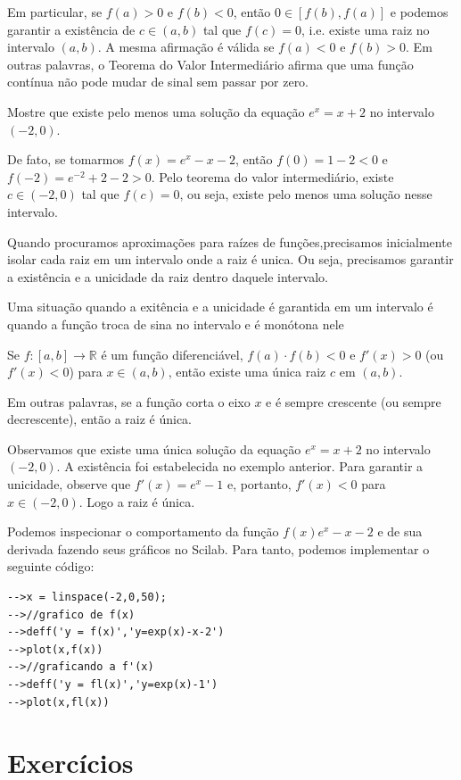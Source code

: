 Em particular, se $f(a)>0$ e $f(b)<0$, então $0\in [f(b),f(a)]$ e podemos garantir a existência de $c\in(a,b)$ tal que $f(c)=0$, i.e. existe uma raiz no intervalo $(a,b)$. A mesma afirmação é válida se $f(a)<0$ e $f(b)>0$. Em outras palavras, o Teorema do Valor Intermediário afirma que uma função contínua não pode mudar de sinal sem passar por zero.

\begin{ex}
Mostre que existe pelo menos uma solução da equação $e^x=x+2$ no intervalo $(-2,0)$.

De fato, se tomarmos $f(x)=e^x-x-2$, então $f(0)=1-2<0$ e $f(-2)=e^{-2}+2-2>0$. Pelo teorema do valor intermediário, existe $c\in(-2,0)$ tal que $f(c)=0$, ou seja, existe pelo menos uma solução nesse intervalo.
\end{ex}
Quando procuramos aproximações para raízes de funções,precisamos inicialmente isolar cada raiz em um intervalo onde a raiz é unica. Ou seja, precisamos garantir a existência e a unicidade da raiz dentro daquele intervalo.

Uma situação quando a exitência e a unicidade é garantida em um intervalo é quando a função troca de sina no intervalo e é monótona nele

\begin{teo}
Se $f:[a,b]\to\mathbb{R}$ é um função diferenciável, $f(a)\cdot f(b)<0$ e $f'(x)>0$ (ou $f'(x)<0$) para $x\in(a,b)$, então existe uma única raiz $c$ em $(a,b)$.
\end{teo}

Em outras palavras, se a função corta o eixo $x$ e é sempre crescente (ou sempre decrescente), então a raiz é única.
\begin{ex}
Observamos que existe uma única solução da equação $e^x=x+2$ no intervalo $(-2,0)$. A existência foi estabelecida no exemplo anterior. Para garantir a unicidade, observe que $f'(x)=e^x-1$ e, portanto, $f'(x)<0$ para $x\in(-2,0)$. Logo a raiz é única.

\ifisscilab
Podemos inspecionar o comportamento da função $f(x) e^x - x - 2$ e de sua derivada fazendo seus gráficos no Scilab. Para tanto, podemos implementar o seguinte código:
\begin{verbatim}
-->x = linspace(-2,0,50);
-->//grafico de f(x)
-->deff('y = f(x)','y=exp(x)-x-2')
-->plot(x,f(x))
-->//graficando a f'(x)
-->deff('y = fl(x)','y=exp(x)-1')
-->plot(x,fl(x))
\end{verbatim}
\fi
\end{ex}

\section*{Exercícios}

